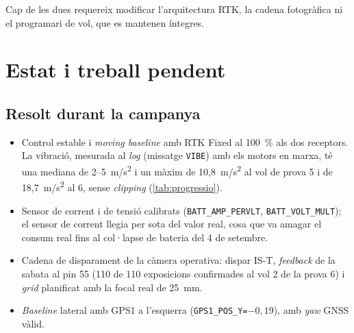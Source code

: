 Cap de les dues requereix modificar l'arquitectura RTK, la cadena fotogràfica ni el programari de vol, que es mantenen íntegres.


\section{Estat i treball pendent}
\label{sec:pendents-proves-vol}

\subsection{Resolt durant la campanya}
\begin{itemize}
    \item Control estable i \emph{moving baseline} amb RTK Fixed al 100~\% als dos receptors. La vibració, mesurada al \emph{log} (missatge \texttt{VIBE}) amb els motors en marxa, té una mediana de 2--5~m/s\textsuperscript{2} i un màxim de 10,8~m/s\textsuperscript{2} al vol de prova 5 i de 18,7~m/s\textsuperscript{2} al 6, sense \emph{clipping} (\cref{tab:progressio}).
    \item Sensor de corrent i de tensió calibrats (\texttt{BATT\_AMP\_PERVLT}, \texttt{BATT\_VOLT\_MULT}); el sensor de corrent llegia per sota del valor real, cosa que va amagar el consum real fins al col·lapse de bateria del 4 de setembre.
    \item Cadena de disparament de la càmera operativa: dispar IS-T, \emph{feedback} de la sabata al pin 55 (110 de 110 exposicions confirmades al vol 2 de la prova 6) i \emph{grid} planificat amb la focal real de 25~mm.
    \item \emph{Baseline} lateral amb GPS1 a l'esquerra (\texttt{GPS1\_POS\_Y=$-0{,}19$}), amb \emph{yaw} GNSS vàlid.
\end{itemize}

